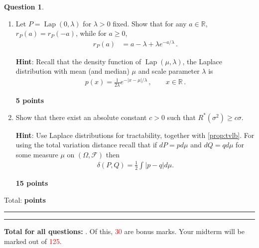 \documentclass{article}
\newcommand{\R}{\mathbb{R}}
\DeclareMathOperator{\Lap}{Lap}
\DeclareMathOperator*{\1}{\mathbbm{1}}
\newcommand{\cF}{\mathcal{F}}
\newcounter{DocPoints}
\newcounter{QuestionPoints}
\newcommand{\points}[1]{	\par\mbox{}\par\noindent\hfill {\bf #1 points}	\addtocounter{DocPoints}{#1}
	\addtocounter{QuestionPoints}{#1}
}
\newcommand{\tpoints}[1]{        	\ifthenelse{\isempty{#1}}	{	}	{		\addtocounter{DocPoints}{#1}
		\addtocounter{QuestionPoints}{#1}
	}													 	\par\mbox{}\par\noindent\hfill {Total: \bf \arabic{QuestionPoints}\xspace points}\par\mbox{}\par\hrule\hrule
	\setcounter{QuestionPoints}{0}
}
\theoremstyle{definition}
\newtheorem{question}{Question}
\theoremstyle{remark}
\newcommand{\hint}{\noindent \textbf{Hint}:\xspace}
\begin{document}
\begin{question}
\begin{enumerate}[(Q1)]
\item 
Let $P = \Lap(0,\lambda)$ for $\lambda>0$ fixed.
Show that for any $a\in \R$, $r_P(a)=r_P(-a)$,
while for $a\ge 0$, 
\begin{align*}
r_P(a) 
 & = a-\lambda + \lambda e^{-a/\lambda}\,.
\end{align*}

\hint
Recall that the density function of $\Lap(\mu,\lambda)$, the Laplace distribution with mean (and median) $\mu$ and scale parameter $\lambda$ is 
\begin{align*}
p(x) = \frac{1}{2\lambda} e^{-|x-\mu|/\lambda}\,, \qquad x\in \R\,.
\end{align*}

\points{5}


\item Show that there exist an absolute constant $c>0$ such that 
$R^*(\sigma^2) \ge  c \sigma$.

\hint Use Laplace distributions for tractability, together with \cref{prop:tvlb}. For using the total variation distance recall that if $dP = p d\mu$ and $dQ = q d\mu$ for some measure $\mu$ on $(\Omega,\cF)$ then 
\begin{align}\label{eq:tvip}
\delta(P,Q) = \frac12 \int |p-q| d\mu.
\end{align}
\points{15}

\end{enumerate}
 
\tpoints{}
\end{question}





\bigskip
\bigskip

\noindent
\textbf{
Total for all questions: }.
Of this, \textcolor{red}{30} are bonus marks. 
Your midterm will be marked out of \textcolor{red}{125}.
\end{document}
